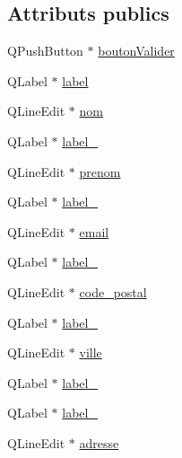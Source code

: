 \subsection*{Attributs publics}
\begin{DoxyCompactItemize}
\item 
Q\-Push\-Button $\ast$ \hyperlink{class_ui___dialog_modification_profil_af20fdf74b0575d4e4a83b3fdd78b773d}{bouton\-Valider}
\item 
Q\-Label $\ast$ \hyperlink{class_ui___dialog_modification_profil_af0cd677e0f1af8ec6649d590537448a0}{label}
\item 
Q\-Line\-Edit $\ast$ \hyperlink{class_ui___dialog_modification_profil_ae95b8fd825c2d092eecd5fdcc83d5213}{nom}
\item 
Q\-Label $\ast$ \hyperlink{class_ui___dialog_modification_profil_abcab2110522286dcc6f1abcfb8df3032}{label\-\_}
\item 
Q\-Line\-Edit $\ast$ \hyperlink{class_ui___dialog_modification_profil_a34af0438ab4d51c5a1cbd3171ca56fbf}{prenom}
\item 
Q\-Label $\ast$ \hyperlink{class_ui___dialog_modification_profil_ae641346202559988ff45516a4ba78e90}{label\-\_}
\item 
Q\-Line\-Edit $\ast$ \hyperlink{class_ui___dialog_modification_profil_a8031c71ba4f8adc3d82bc08d73190f53}{email}
\item 
Q\-Label $\ast$ \hyperlink{class_ui___dialog_modification_profil_ab4a50f6eb1a12c3960b9482bd236a97c}{label\-\_}
\item 
Q\-Line\-Edit $\ast$ \hyperlink{class_ui___dialog_modification_profil_a93b6c690c6707d373fc814a119821546}{code\-\_\-postal}
\item 
Q\-Label $\ast$ \hyperlink{class_ui___dialog_modification_profil_a29db887be1dec97eee38c3a93a765772}{label\-\_}
\item 
Q\-Line\-Edit $\ast$ \hyperlink{class_ui___dialog_modification_profil_a1c6d48ece9604745e80462ef426ac0ea}{ville}
\item 
Q\-Label $\ast$ \hyperlink{class_ui___dialog_modification_profil_a65181d9deaa1b933282b99de2d7240f7}{label\-\_}
\item 
Q\-Label $\ast$ \hyperlink{class_ui___dialog_modification_profil_a04a21015743a0eb5881251fa68c959fa}{label\-\_}
\item 
Q\-Line\-Edit $\ast$ \hyperlink{class_ui___dialog_modification_profil_abd307db23d2f04b3a0e4a596cdbe8656}{adresse}
\end{DoxyCompactItemize}


